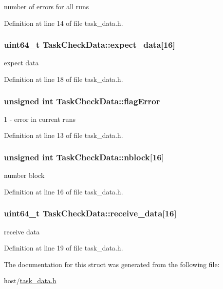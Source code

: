 number of errors for all runs 

Definition at line 14 of file task\_\-data.h.\hypertarget{structTaskCheckData_a331e59af2ad31c5ff815604ae66b3270}{
\subsubsection[{expect\_\-data}]{\setlength{\rightskip}{0pt plus 5cm}uint64\_\-t {\bf TaskCheckData::expect\_\-data}\mbox{[}16\mbox{]}}}
\label{structTaskCheckData_a331e59af2ad31c5ff815604ae66b3270}


expect data 

Definition at line 18 of file task\_\-data.h.\hypertarget{structTaskCheckData_af9ebbb6d1c36944134542b6bf315c86e}{
\subsubsection[{flagError}]{\setlength{\rightskip}{0pt plus 5cm}unsigned int {\bf TaskCheckData::flagError}}}
\label{structTaskCheckData_af9ebbb6d1c36944134542b6bf315c86e}


1 -\/ error in current runs 

Definition at line 13 of file task\_\-data.h.\hypertarget{structTaskCheckData_ab30a0e66e9a6aa9bfb55971fc9305f9b}{
\subsubsection[{nblock}]{\setlength{\rightskip}{0pt plus 5cm}unsigned int {\bf TaskCheckData::nblock}\mbox{[}16\mbox{]}}}
\label{structTaskCheckData_ab30a0e66e9a6aa9bfb55971fc9305f9b}


number block 

Definition at line 16 of file task\_\-data.h.\hypertarget{structTaskCheckData_a9cec8fbf8e93cd5cd5569a5cb67d0556}{
\subsubsection[{receive\_\-data}]{\setlength{\rightskip}{0pt plus 5cm}uint64\_\-t {\bf TaskCheckData::receive\_\-data}\mbox{[}16\mbox{]}}}
\label{structTaskCheckData_a9cec8fbf8e93cd5cd5569a5cb67d0556}


receive data 

Definition at line 19 of file task\_\-data.h.

The documentation for this struct was generated from the following file:\begin{DoxyCompactItemize}
\item 
host/\hyperlink{task__data_8h}{task\_\-data.h}\end{DoxyCompactItemize}
